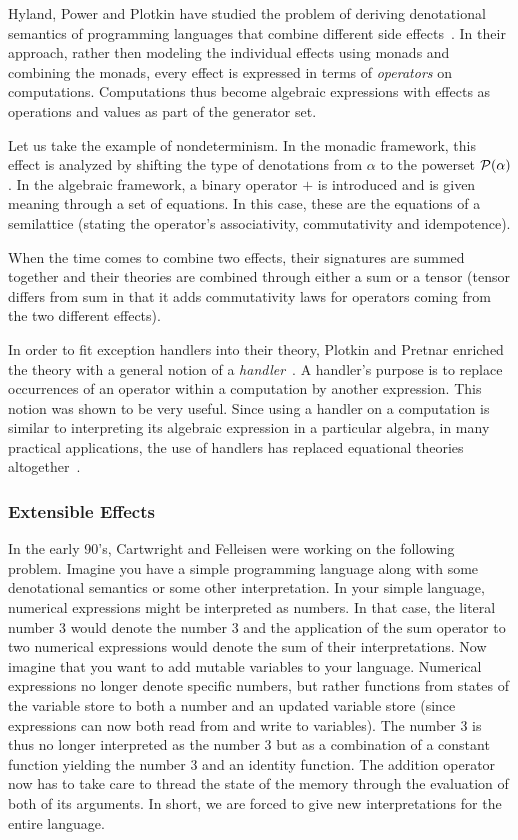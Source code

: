 Hyland, Power and Plotkin have studied the problem of deriving denotational
semantics of programming languages that combine different side
effects~\cite{hyland2006combining}. In their approach, rather then modeling
the individual effects using monads and combining the monads, every effect
is expressed in terms of \emph{operators} on computations. Computations
thus become algebraic expressions with effects as operations and values as
part of the generator set.

Let us take the example of nondeterminism. In the monadic framework, this
effect is analyzed by shifting the type of denotations from $\alpha$ to the
powerset $\mathcal{P}(\alpha)$. In the algebraic framework, a binary operator $+$
is introduced and is given meaning through a set of equations.  In this
case, these are the equations of a semilattice (stating the operator's
associativity, commutativity and idempotence).

When the time comes to combine two effects, their signatures are summed
together and their theories are combined through either a sum or a tensor
(tensor differs from sum in that it adds commutativity laws for operators
coming from the two different effects).

In order to fit exception handlers into their theory, Plotkin and Pretnar
enriched the theory with a general notion of a
\emph{handler}~\cite{plotkin2013handling}. A handler's purpose is to
replace occurrences of an operator within a computation by another
expression. This notion was shown to be very useful. Since using a handler
on a computation is similar to interpreting its algebraic expression in a
particular algebra, in many practical applications, the use of handlers has
replaced equational theories
altogether~\cite{bauer2012programming,kammar2013handlers,brady2013programming}.


\subsubsection*{Extensible Effects}

In the early 90's, Cartwright and Felleisen were working on the following
problem. Imagine you have a simple programming language along with some
denotational semantics or some other interpretation. In your simple
language, numerical expressions might be interpreted as numbers. In that
case, the literal number 3 would denote the number 3 and the application of
the sum operator to two numerical expressions would denote the sum of their
interpretations. Now imagine that you want to add mutable variables to
your language. Numerical expressions no longer denote specific numbers, but
rather functions from states of the variable store to both a number and an
updated variable store (since expressions can now both read from and write
to variables). The number 3 is thus no longer interpreted as the number 3
but as a combination of a constant function yielding the number 3 and an
identity function. The addition operator now has to take care to thread the
state of the memory through the evaluation of both of its arguments. In
short, we are forced to give new interpretations for the entire language.


